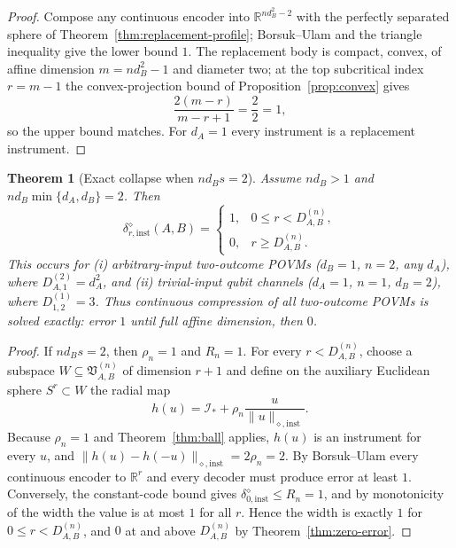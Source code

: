 \documentclass[11pt,a4paper]{article}
\newtheorem{theorem}{Theorem}[section]
\begin{document}
\begin{proof}
Compose any continuous encoder into $\mathbb R^{nd_B^2-2}$ with the perfectly separated sphere of Theorem~\ref{thm:replacement-profile}; Borsuk--Ulam and the triangle inequality give the lower bound $1$. The replacement body is compact, convex, of affine dimension $m=nd_B^2-1$ and diameter two; at the top subcritical index $r=m-1$ the convex-projection bound of Proposition~\ref{prop:convex} gives
\[
\frac{2(m-r)}{m-r+1}=\frac{2}{2}=1,
\]
so the upper bound matches. For $d_A=1$ every instrument is a replacement instrument.
\end{proof}

\begin{theorem}[Exact collapse when $nd_Bs=2$]
\label{thm:collapse}
Assume $nd_B>1$ and $nd_B\min\{d_A,d_B\}=2$. Then
\[
\delta_{r,\mathrm{inst}}^{\diamond}(A,B)=
\begin{cases}
1,&0\le r<D_{A,B}^{(n)},\\
0,&r\ge D_{A,B}^{(n)}.
\end{cases}
\]
This occurs for (i) arbitrary-input two-outcome POVMs ($d_B=1$, $n=2$, any $d_A$), where $D_{A,1}^{(2)}=d_A^2$, and (ii) trivial-input qubit channels ($d_A=1$, $n=1$, $d_B=2$), where $D_{1,2}^{(1)}=3$. Thus continuous compression of all two-outcome POVMs is solved exactly: error $1$ until full affine dimension, then $0$.
\end{theorem}

\begin{proof}
If $nd_Bs=2$, then $\rho_n=1$ and $R_n=1$. For every $r<D_{A,B}^{(n)}$, choose a subspace $W\subseteq\mathfrak V_{A,B}^{(n)}$ of dimension $r+1$ and define on the auxiliary Euclidean sphere $S^r\subset W$ the radial map
\[
h(u)=\mathcal I_*+\rho_n\frac{u}{\|u\|_{\diamond,\mathrm{inst}}}.
\]
Because $\rho_n=1$ and Theorem~\ref{thm:ball} applies, $h(u)$ is an instrument for every $u$, and $\|h(u)-h(-u)\|_{\diamond,\mathrm{inst}}=2\rho_n=2$. By Borsuk--Ulam every continuous encoder to $\mathbb R^r$ and every decoder must produce error at least $1$. Conversely, the constant-code bound gives $\delta_{0,\mathrm{inst}}^{\diamond}\le R_n=1$, and by monotonicity of the width the value is at most $1$ for all $r$. Hence the width is exactly $1$ for $0\le r<D_{A,B}^{(n)}$, and $0$ at and above $D_{A,B}^{(n)}$ by Theorem~\ref{thm:zero-error}.
\end{proof}
\end{document}
